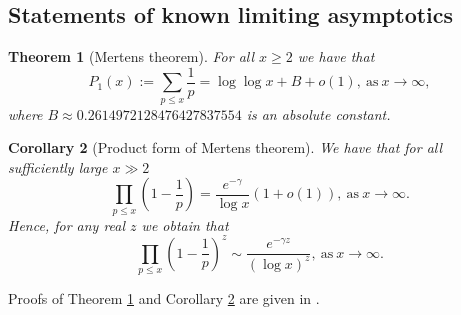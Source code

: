 \documentclass[11pt,reqno,a4letter]{article}
\numberwithin{figure}{section}
\numberwithin{table}{section}
\theoremstyle{plain}
\newtheorem{theorem}{Theorem}
\newtheorem{cor}[theorem]{Corollary}
\numberwithin{theorem}{section}
\theoremstyle{definition}
\begin{document}
\subsection{Statements of known limiting asymptotics} 
\label{subSection_OtherFactsAndResults} 

\begin{theorem}[Mertens theorem]
\label{theorem_Mertens_theorem} 
For all $x \geq 2$ we have that 
\[
P_1(x) := \sum_{p \leq x} \frac{1}{p} = \log\log x + B + o(1), 
     \mathrm{\ as\ } x \rightarrow \infty, 
\]
where 
$B \approx 0.2614972128476427837554$ 
is an absolute constant.
\end{theorem} 

\begin{cor}[Product form of Mertens theorem] 
\label{lemma_Gz_productTermV2} 
We have that for all sufficiently large $x \gg 2$ 
\[
\prod_{p \leq x} \left(1 - \frac{1}{p}\right) = \frac{e^{-\gamma}}{\log x}\left( 
     1 + o(1)\right), \mathrm{\ as\ } x \rightarrow \infty. 
\]
Hence, for any real $z$ we obtain that 
\[
\prod_{p \leq x} \left(1 - \frac{1}{p}\right)^{z} \sim 
     \frac{e^{-\gamma z}}{(\log x)^{z}}, \mathrm{\ as\ } x \rightarrow \infty. 
\]
\end{cor} 

Proofs of Theorem \ref{theorem_Mertens_theorem} and 
Corollary \ref{lemma_Gz_productTermV2} are given in 
\cite[\S 22.7; \S 22.8]{HARDYWRIGHT}. 
\end{document}
